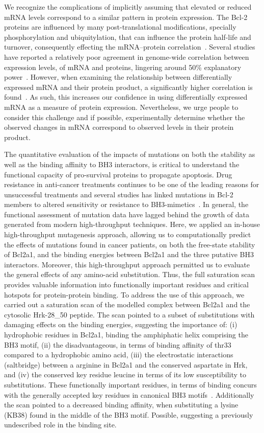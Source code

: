 \documentclass[10pt,letterpaper]{article}
\begin{document}
We recognize the complications of implicitly assuming that elevated or reduced mRNA levels correspond to a similar pattern in protein expression. The Bcl-2 proteins are influenced by many post-translational modifications, specially phosphorylation and ubiquitylation, that can influence the protein half-life and turnover, consequently effecting the mRNA–protein correlation~\cite{Czabotar2014}.
Several studies have reported a relatively poor agreement in genome-wide correlation between expression levels, of mRNA and proteins, lingering around 50\% explanatory power~\cite{Maier2009}. However, when examining the relationship between differentially expressed mRNA and their protein product, a significantly higher correlation is found~\cite{Koussounadis2015}. As such, this increases our confidence in using differentially expressed mRNA as a measure of protein expression. Nevertheless, we urge people to consider this challenge and if possible, experimentally determine whether the observed changes in mRNA correspond to observed levels in their protein product. 

The quantitative evaluation of the impacts of mutations on both the stability as well as the binding affinity to BH3 interactors, is critical to understand the functional capacity of pro-survival proteins to propagate apoptosis. Drug resistance in anti-cancer treatments continues to be one of the leading reasons for unsuccessful treatments and several studies has linked mutations in Bcl-2 members to altered sensitivity or resistance to BH3-mimetics~\cite{Letai2002,Fresquet2014,Singh2016}. In general, the functional assessment of mutation data have lagged behind the growth of data generated from modern high-throughput techniques. Here, we applied an in-house high-throughput mutagenesis approach, allowing us to computationally predict the effects of mutations found in cancer patients, on both the free-state stability of Bcl2a1, and the binding energies between Bcl2a1 and the three putative BH3 interactors. Moreover, this high-throughput approach permitted us to evaluate the general effects of any amino-acid substitution. Thus, the full saturation scan provides valuable information into functionally important residues and critical hotspots for protein-protein binding.
To address the use of this approach, we carried out a saturation scan of the modelled complex between Bcl2a1 and the cytosolic Hrk-28\_50 peptide. The scan pointed to a subset of substitutions with damaging effects on the binding energies, suggesting the importance of: (i) hydrophobic residues in Bcl2a1, binding the amphiphatic helix comprising the BH3 motif, (ii) the disadvantageous, in terms of binding affinity of thr33 compared to a hydrophobic amino acid, (iii) the electrostatic interactions (saltbridge) between a arginine in Bcl2a1 and the conserved aspartate in Hrk, and (iv) the conserved key residue leucine in terms of its low susceptibility to substitutions. These functionally important residues, in terms of binding concurs with the generally accepted key residues in canonical BH3 motifs~\cite{Hinds2005, Czabotar2007, Sattler2010}. Additionally the scan pointed to a decreased binding affinity, when substituting a lysine (KB38) found in the middle of the BH3 motif. Possible, suggesting a previously undescribed role in the binding site.
\end{document}
